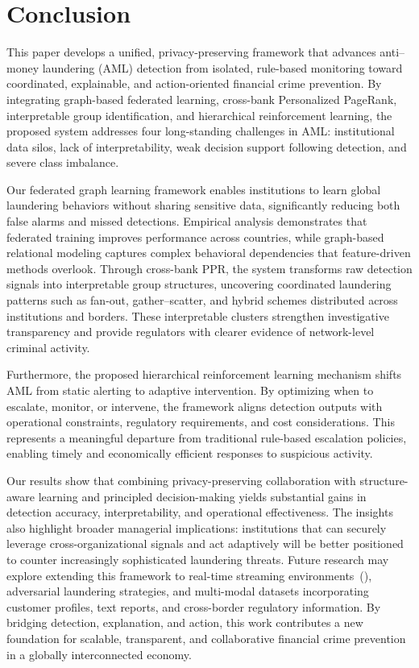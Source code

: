 \section{Conclusion}
This paper develops a unified, privacy-preserving framework that advances anti–money laundering (AML) detection from isolated, rule-based monitoring toward coordinated, explainable, and action-oriented financial crime prevention. By integrating graph-based federated learning, cross-bank Personalized PageRank, interpretable group identification, and hierarchical reinforcement learning, the proposed system addresses four long-standing challenges in AML: institutional data silos, lack of interpretability, weak decision support following detection, and severe class imbalance.

Our federated graph learning framework enables institutions to learn global laundering behaviors without sharing sensitive data, significantly reducing both false alarms and missed detections. Empirical analysis demonstrates that federated training improves performance across countries, while graph-based relational modeling captures complex behavioral dependencies that feature-driven methods overlook. Through cross-bank PPR, the system transforms raw detection signals into interpretable group structures, uncovering coordinated laundering patterns such as fan-out, gather–scatter, and hybrid schemes distributed across institutions and borders. These interpretable clusters strengthen investigative transparency and provide regulators with clearer evidence of network-level criminal activity.

Furthermore, the proposed hierarchical reinforcement learning mechanism shifts AML from static alerting to adaptive intervention. By optimizing when to escalate, monitor, or intervene, the framework aligns detection outputs with operational constraints, regulatory requirements, and cost considerations. This represents a meaningful departure from traditional rule-based escalation policies, enabling timely and economically efficient responses to suspicious activity.

Our results show that combining privacy-preserving collaboration with structure-aware learning and principled decision-making yields substantial gains in detection accuracy, interpretability, and operational effectiveness. The insights also highlight broader managerial implications: institutions that can securely leverage cross-organizational signals and act adaptively will be better positioned to counter increasingly sophisticated laundering threats. Future research may explore extending this framework to real-time streaming environments~(\cite{zheng2024online, zheng2024mulan}), adversarial laundering strategies, and multi-modal datasets incorporating customer profiles, text reports, and cross-border regulatory information. By bridging detection, explanation, and action, this work contributes a new foundation for scalable, transparent, and collaborative financial crime prevention in a globally interconnected economy.
